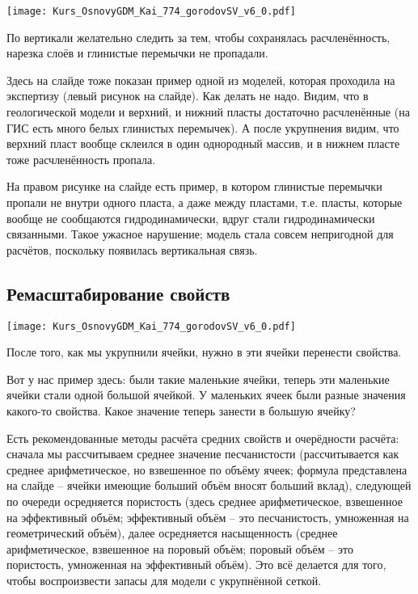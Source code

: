 \documentclass[main.tex]{subfiles}
\begin{document}
\texttt{[image: Kurs\_OsnovyGDM\_Kai\_774\_gorodovSV\_v6\_0.pdf]}

По вертикали желательно следить за тем, чтобы сохранялась расчленённость, нарезка слоёв и глинистые перемычки не пропадали.

Здесь на слайде тоже показан пример одной из моделей, которая проходила на экспертизу (левый рисунок на слайде).
Как делать не надо.
Видим, что в геологической модели и верхний, и нижний пласты достаточно расчленённые (на ГИС есть много белых глинистых перемычек).
А после укрупнения видим, что верхний пласт вообще склеился в один однородный массив, и в нижнем пласте тоже расчленённость пропала.

На правом рисунке на слайде есть пример, в котором глинистые перемычки пропали не внутри одного пласта, а даже между пластами, т.е. пласты, которые вообще не сообщаются гидродинамически, вдруг стали гидродинамически связанными.
Такое ужасное нарушение; модель стала совсем непригодной для расчётов, поскольку появилась вертикальная связь.

\subsection{Ремасштабирование свойств}

\texttt{[image: Kurs\_OsnovyGDM\_Kai\_774\_gorodovSV\_v6\_0.pdf]}

После того, как мы укрупнили ячейки, нужно в эти ячейки перенести свойства.

Вот у нас пример здесь: были такие маленькие ячейки, теперь эти маленькие ячейки стали одной большой ячейкой. У маленьких ячеек были разные значения какого-то свойства. Какое значение теперь занести в большую ячейку?

Есть рекомендованные методы расчёта средних свойств и очерёдности расчёта: сначала мы рассчитываем среднее значение песчанистости (рассчитывается как среднее арифметическое, но взвешенное по объёму ячеек; формула представлена на слайде -- ячейки имеющие больший объём вносят больший вклад), следующей по очереди осредняется пористость (здесь среднее арифметическое, взвешенное на эффективный объём; эффективный объём -- это песчанистость, умноженная на геометрический объём), далее осредняется насыщенность (среднее арифметическое, взвешенное на поровый объём; поровый объём -- это пористость, умноженная на эффективный объём).
Это всё делается для того, чтобы воспроизвести запасы для модели с укрупнённой сеткой.
\end{document}
